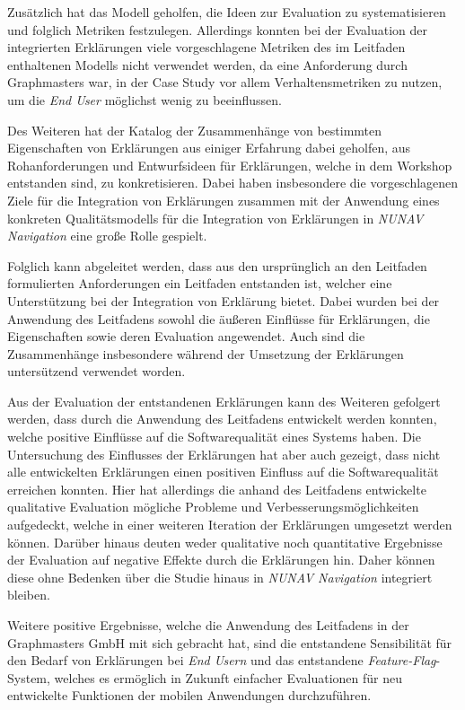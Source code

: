 Zusätzlich hat das Modell geholfen, die Ideen zur Evaluation zu systematisieren und folglich Metriken festzulegen. Allerdings konnten bei der Evaluation der integrierten Erklärungen viele vorgeschlagene Metriken des im Leitfaden enthaltenen Modells nicht verwendet werden, da eine Anforderung durch Graphmasters war, in der Case Study vor allem Verhaltensmetriken zu nutzen, um die \textit{End User} möglichst wenig zu beeinflussen.

Des Weiteren hat der Katalog der Zusammenhänge von bestimmten Eigenschaften von Erklärungen aus einiger Erfahrung dabei geholfen, aus Rohanforderungen und Entwurfsideen für Erklärungen, welche in dem Workshop entstanden sind, zu konkretisieren. Dabei haben insbesondere die vorgeschlagenen Ziele für die Integration von Erklärungen zusammen mit der Anwendung eines konkreten Qualitätsmodells für die Integration von Erklärungen in \textit{NUNAV Navigation} eine große Rolle gespielt.

Folglich kann abgeleitet werden, dass aus den ursprünglich an den Leitfaden formulierten Anforderungen ein Leitfaden entstanden ist, welcher eine Unterstützung bei der Integration von Erklärung bietet. Dabei wurden bei der Anwendung des Leitfadens sowohl die äußeren Einflüsse für Erklärungen, die Eigenschaften sowie deren Evaluation angewendet. Auch sind die Zusammenhänge insbesondere während der Umsetzung der Erklärungen untersützend verwendet worden.

Aus der Evaluation der entstandenen Erklärungen kann des Weiteren gefolgert werden, dass durch die Anwendung des Leitfadens entwickelt werden konnten, welche positive Einflüsse auf die Softwarequalität eines Systems haben. Die Untersuchung des Einflusses der Erklärungen hat aber auch gezeigt, dass nicht alle entwickelten Erklärungen einen positiven Einfluss auf die Softwarequalität erreichen konnten. Hier hat allerdings die anhand des Leitfadens entwickelte qualitative Evaluation mögliche Probleme und Verbesserungsmöglichkeiten aufgedeckt, welche in einer weiteren Iteration der Erklärungen umgesetzt werden können. Darüber hinaus deuten weder qualitative noch quantitative Ergebnisse der Evaluation auf negative Effekte durch die Erklärungen hin. Daher können diese ohne Bedenken über die Studie hinaus in \textit{NUNAV Navigation} integriert bleiben.

Weitere positive Ergebnisse, welche die Anwendung des Leitfadens in der Graphmasters GmbH mit sich gebracht hat, sind die entstandene Sensibilität für den Bedarf von Erklärungen bei \textit{End Usern} und das entstandene \textit{Feature-Flag}-System, welches es ermöglich in Zukunft einfacher Evaluationen für neu entwickelte Funktionen der mobilen Anwendungen durchzuführen.

